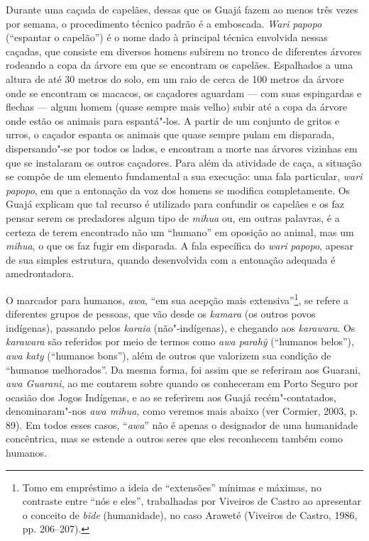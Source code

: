 Durante uma caçada de capelães, dessas que os Guajá fazem ao menos três
vezes por semana, o procedimento técnico padrão é a emboscada.
\emph{Wari} \emph{papopo} (``espantar o capelão'') é o nome dado à
principal técnica envolvida nessas caçadas, que consiste em diversos
homens subirem no tronco de diferentes árvores rodeando a copa da árvore
em que se encontram os capelães. Espalhados a uma altura de até 30
metros do solo, em um raio de cerca de 100 metros da árvore onde se
encontram os macacos, os caçadores aguardam --- com suas espingardas e
flechas --- algum homem (quase sempre mais velho) subir até a copa da
árvore onde estão os animais para espantá"-los. A partir de um conjunto
de gritos e urros, o caçador espanta os animais que quase sempre pulam
em disparada, dispersando"-se por todos os lados, e encontram a morte nas
árvores vizinhas em que se instalaram os outros caçadores. Para além da
atividade de caça, a situação se compõe de um elemento fundamental a sua
execução: uma fala particular, \emph{wari papopo}, em que a entonação da
voz dos homens se modifica completamente. Os Guajá explicam que tal
recurso é utilizado para confundir os capelães e os faz pensar serem os
predadores algum tipo de \emph{mihua} ou, em outras palavras, é a
certeza de terem encontrado não um ``humano'' em oposição ao animal, mas
um \emph{mihua}, o que os faz fugir em disparada. A fala específica do
\emph{wari} \emph{papopo}, apesar de sua simples estrutura, quando
desenvolvida com a entonação adequada é amedrontadora.

O marcador para humanos, \emph{awa}, ``em sua acepção mais
extensiva''\footnote{Tomo em empréstimo a ideia de ``extensões'' mínimas e
  máximas, no contraste entre ``nós e eles'', trabalhadas por Viveiros de
  Castro ao apresentar o conceito de \emph{bĩde} (humanidade), no caso
  Araweté (Viveiros de Castro, 1986, pp. 206--207).}, se refere a diferentes
grupos de pessoas, que vão desde os \emph{kamara} (os outros povos
indígenas), passando pelos \emph{karaia} (não"-indígenas), e chegando aos
\emph{karawara}. Os \emph{karawara} são referidos por meio de termos
como \emph{awa parahỹ} (``humanos belos''), \emph{awa katy} (``humanos
bons''), além de outros que valorizem sua condição de ``humanos
melhorados''. Da mesma forma, foi assim que se referiram aos Guarani,
\emph{awa Guarani}, ao me contarem sobre quando os conheceram em Porto
Seguro por ocasião dos Jogos Indígenas, e ao se referirem aos Guajá
recém"-contatados, denominaram"-nos \emph{awa mihua,} como veremos mais
abaixo (ver Cormier, 2003, p. 89). Em todos esses casos, ``\emph{awa}''
não é apenas o designador de uma humanidade concêntrica, mas se estende
a outros seres que eles reconhecem também como humanos.

